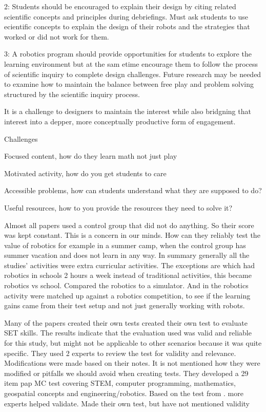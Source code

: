 2: Students should be encouraged to explain their design by citing related scientific concepts and principles during debriefings. Must ask students to use ecientific concepts to explain the design of their robots and the strategies that worked or did not work for them. 

3: A robotics program should provide opportunities for students to explore the learning environment but at the sam etime encourage them to follow the process of scientific inquiry to complete design challenges. Future research may be needed to examine how to maintain the balance between free play and problem solving structured by the scientific inquiry process. 

It is a challenge to designers to maintain the interest while also bridgning that interest into a depper, more conceptually productive form of engagement. 

Challenges

Focused content, how do they learn math not just play

Motivated activity, how do you get students to care

Accessible problems, how can students understand what they are supposed to do?

Useful resources, how to you provide the resources they need to solve it?

Almost all papers used a control group that did not do anything. So their score was kept constant. This is a concern in our minds. How can they reliably test the value of robotics for example in a summer camp, when the control group has summer vacation and does not learn in any way. In summary generally all the studies' activities were extra curricular activities. The exceptions are \cite{lindh2007does} which had robotics in schools 2 hours a week instead of traditional activities, this became robotics vs school. \cite{mitnik2009collaborative} Compared the robotics to a simulator. And in \cite{silk2011resources} the robotics activity were matched up against a robotics competition, to see if the learning gains came from their test setup and not just generally working with robots.  

\bigskip\noindent
Many of the papers created their own tests
\cite{barker2007robotics} created their own test to evaluate SET skills. The results indicate that the evaluation used was valid and reliable for this study, but might not be applicable to other scenarios because it was quite specific. They used 2 experts to review the test for validity and relevance. Modifications were made based on their notes. It is not mentioned how they were modified or pitfalls we should avoid when creating tests.
\cite{nugent2008effect} They developed a 29 item pap MC test covering STEM, computer programming, mathematics, geospatial concepts and engineering/robotics. Based on the test from \cite{barker2007robotics}. more experts helped validate. 
\cite{williams2007acquisition} Made their own test, but have not mentioned validity


